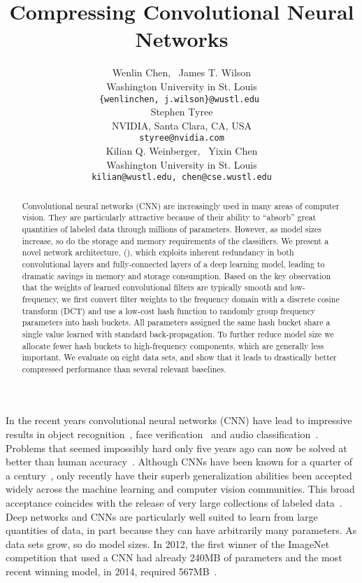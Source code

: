 \documentclass{article} %
\title{Compressing Convolutional Neural Networks}
\author{
Wenlin Chen, ~James T. Wilson\\
Washington University in St. Louis\\
\texttt{\{wenlinchen, j.wilson\}@wustl.edu } \\
\And
Stephen Tyree\\
NVIDIA, Santa Clara, CA, USA\\
\texttt{styree@nvidia.com} \\
\AND
Kilian Q. Weinberger, ~Yixin Chen\\
Washington University in St. Louis \\
\texttt{kilian@wustl.edu, chen@cse.wustl.edu} \\
}
\begin{document}
\maketitle

\begin{abstract}
Convolutional neural networks (CNN) are increasingly used in many areas of computer vision. They are particularly attractive because of their ability to ``absorb'' great quantities of labeled data through millions of parameters. However, as model sizes increase, so do the storage and memory requirements of the classifiers. We present a novel network architecture, \fullname{} (\abbrev{}), which exploits inherent redundancy in both convolutional layers and fully-connected layers of a deep learning model, leading to dramatic savings in memory and storage consumption. Based on the key observation that the weights of learned convolutional filters are typically smooth and low-frequency, we first convert filter weights to the frequency domain with a discrete cosine transform (DCT) and use a low-cost hash function to randomly group frequency parameters into hash buckets. All parameters assigned the same hash bucket share a single value learned with standard back-propagation.
To further reduce model size we allocate fewer hash buckets to high-frequency components, which are generally less important.
We evaluate \abbrev{} on eight data sets, and show that it leads to drastically better compressed performance than several relevant baselines.

\end{abstract}

In the recent years convolutional neural networks (CNN) have lead to impressive results in object recognition~\cite{krizhevsky2012imagenet}, face verification~\cite{schroff2015facenet} and audio classification~\cite{lee2009unsupervised}. Problems that seemed impossibly hard only five years ago can now be solved at better than human accuracy~\cite{he2015delving}.
Although CNNs have been known for a quarter of a century~\cite{fukushima1980neocognitron}, only recently have their superb generalization abilities been accepted widely across the machine learning and computer vision communities.
This broad acceptance coincides with the release of very large collections of labeled data~\cite{deng2009imagenet}. Deep networks and CNNs are particularly well suited to learn from large quantities of data, in part because they can have arbitrarily many parameters. As data sets grow, so do model sizes. In 2012, the first winner of the ImageNet competition that used a CNN had already 240MB of parameters and the most recent winning model, in 2014, required 567MB~\cite{SimonyanZ14a}.
\end{document}
